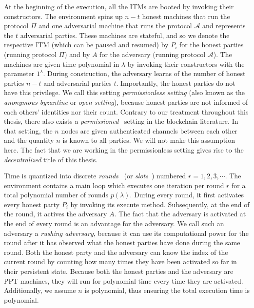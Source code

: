 At the beginning of the execution, all the ITMs are booted by invoking their
constructors. The environment spins up $n - t$ honest machines that run
the protocol $\Pi$ and one adversarial machine that runs the protocol
$\mathcal{A}$ and represents the $t$ adversarial parties. These machines are
stateful, and so we denote the respective ITM (which can be paused and resumed)
by $P_i$ for the honest parties (running protocol $\Pi$) and by $A$ for the
adversary (running protocol $\mathcal{A}$). The machines are given time
polynomial in $\lambda$ by invoking their constructors with the parameter
$1^\lambda$. During construction, the adversary
learns of the number of honest parties $n - t$ and adversarial parties $t$.
Importantly, the honest parties do not have this privilege. We
call this setting \emph{permissionless setting} (also
known as the \emph{anonymous byzantine} or \emph{open setting}), because honest
parties are not informed of each others' identities nor their count. Contrary to
our treatment throughout this thesis, there also exists a
\emph{permissioned}~\cite{consensus-sok} setting in the blockchain literature.
In that setting, the $n$ nodes are given authenticated channels between each
other and the quantity $n$ is known to all parties. We will not make this
assumption here. The fact that we are working in the permissionless setting
gives rise to the \emph{decentralized} title of this
thesis.

Time is quantized into discrete \emph{rounds}~\cite{backbone} (or \emph{slots}~\cite{ouroboros}) numbered $r = 1, 2, 3, \cdots$.
The
environment contains a main loop which executes one iteration per round $r$ for
a total polynomial number of rounds $p(\lambda)$. During
every round, it first activates every honest party $P_i$ by invoking its
\textsf{execute} method. Subsequently, at the end of
the round, it actives the adversary $A$. The fact that the adversary is activated at
the end of every round is an advantage for the adversary. We call such an
adversary a \emph{rushing adversary}, because it can use its computational power
for the round after it has observed what the honest parties have done during the
same round. Both the honest party and the adversary can know the index of the
current round by counting how many times they have been activated so far in
their persistent state. Because both the honest parties and the
adversary are PPT machines, they will run for polynomial time every time they
are activated. Additionally, we assume $n$ is polynomial, thus ensuring the
total execution time is polynomial.

